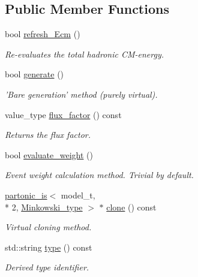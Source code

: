 \subsection*{Public Member Functions}
\begin{DoxyCompactItemize}
\item 
\hypertarget{a00408_a5e0fcbdf96342a44eabb3c1c96d237b7}{bool \hyperlink{a00408_a5e0fcbdf96342a44eabb3c1c96d237b7}{refresh\-\_\-\-Ecm} ()}\label{a00408_a5e0fcbdf96342a44eabb3c1c96d237b7}

\begin{DoxyCompactList}\small\item\em Re-\/evaluates the total hadronic C\-M-\/energy. \end{DoxyCompactList}\item 
bool \hyperlink{a00408_a75c572d16c6a484490a70d799a24b600}{generate} ()
\begin{DoxyCompactList}\small\item\em 'Bare generation' method (purely virtual). \end{DoxyCompactList}\item 
\hypertarget{a00408_a025119eeaf845bf23c75fe3a94d5ddd6}{value\-\_\-type \hyperlink{a00408_a025119eeaf845bf23c75fe3a94d5ddd6}{flux\-\_\-factor} () const }\label{a00408_a025119eeaf845bf23c75fe3a94d5ddd6}

\begin{DoxyCompactList}\small\item\em Returns the flux factor. \end{DoxyCompactList}\item 
\hypertarget{a00408_aa1255edc9ce6fa8c2bcf84ed1c3f0ad8}{bool \hyperlink{a00408_aa1255edc9ce6fa8c2bcf84ed1c3f0ad8}{evaluate\-\_\-weight} ()}\label{a00408_aa1255edc9ce6fa8c2bcf84ed1c3f0ad8}

\begin{DoxyCompactList}\small\item\em Event weight calculation method. Trivial by default. \end{DoxyCompactList}\item 
\hypertarget{a00408_a1c44965bba62f5840085dec199ba2b33}{\hyperlink{a00406}{partonic\-\_\-is}$<$ model\-\_\-t, \\*
2, \hyperlink{a00369}{Minkowski\-\_\-type} $>$ $\ast$ \hyperlink{a00408_a1c44965bba62f5840085dec199ba2b33}{clone} () const }\label{a00408_a1c44965bba62f5840085dec199ba2b33}

\begin{DoxyCompactList}\small\item\em Virtual cloning method. \end{DoxyCompactList}\item 
\hypertarget{a00408_a00fcf88071b67d320b081bb159e007fc}{std\-::string \hyperlink{a00408_a00fcf88071b67d320b081bb159e007fc}{type} () const }\label{a00408_a00fcf88071b67d320b081bb159e007fc}

\begin{DoxyCompactList}\small\item\em Derived type identifier. \end{DoxyCompactList}\end{DoxyCompactItemize}
